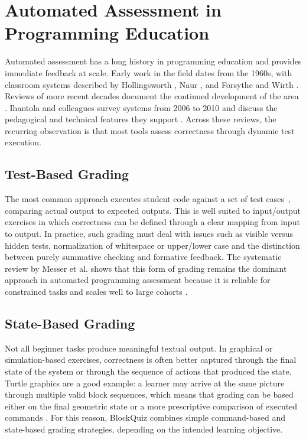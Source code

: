 \section{Automated Assessment in Programming Education}
\label{sec:auto-grading}

Automated assessment has a long history in programming education and
provides immediate feedback at scale. Early work in the field dates
from the 1960s, with classroom systems described by Hollingsworth
\cite{hollingsworth1960}, Naur \cite{naur1964}, and Forsythe and Wirth
\cite{forsythe1965}. Reviews of more recent decades document the
continued development of the area
\cite{alaMutka2005, douce2005, ihantola2010, messer-neil}.
Ihantola and colleagues survey systems from 2006 to 2010 and discuss
the pedagogical and technical features they support
\cite{ihantola2010}. Across these reviews, the recurring observation
is that most tools assess correctness through dynamic test execution.


\subsection{Test-Based Grading}
The most common approach executes student code against a set of test cases~\cite{douce2005, alaMutka2005},
comparing actual output to expected outputs. This is well suited to input/output exercises in which correctness can be defined through a clear mapping from input to output.
In practice, such grading must deal with issues such as visible versus hidden tests, normalization of whitespace or upper/lower case and the distinction between purely summative checking
and formative feedback.
The systematic review by Messer et al. shows that this form of grading remains the dominant approach in automated programming assessment because it
is reliable for constrained tasks and scales well to large cohorts \cite{messer-neil}.

\subsection{State-Based Grading}
Not all beginner tasks produce meaningful textual output. In graphical or simulation-based exercises, correctness is often better captured through the final state of the system
or through the sequence of actions that produced the state.
Turtle graphics are a good example: a learner may arrive at the same picture through multiple valid block sequences, which means that grading can
be based either on the final geometric state or a more prescriptive comparison of executed commands \cite{malmi2004}. For this reason, BlockQuiz combines simple command-based and state-based
grading strategies, depending on the intended learning objective.

